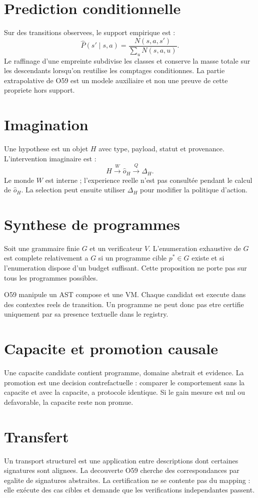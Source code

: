 \documentclass[11pt,a4paper]{article}
\begin{document}
\section{Prediction conditionnelle}
Sur des transitions observees, le support empirique est :
\[
\widehat P(s'\mid s,a)=\frac{N(s,a,s')}{\sum_u N(s,a,u)}.
\]
Le raffinage d'une empreinte subdivise les classes et conserve la masse totale sur les descendants lorsqu'on reutilise les comptages conditionnes. La partie extrapolative de O59 est un modele auxiliaire et non une preuve de cette propriete hors support.

\section{Imagination}
Une hypothese est un objet $H$ avec type, payload, statut et provenance. L'intervention imaginaire est :
\[
H\xrightarrow{W}\hat o_H\xrightarrow{Q}\Delta_H.
\]
Le monde $W$ est interne ; l'experience reelle n'est pas consultée pendant le calcul de $\hat o_H$. La selection peut ensuite utiliser $\Delta_H$ pour modifier la politique d'action.

\section{Synthese de programmes}
Soit une grammaire finie $G$ et un verificateur $V$. L'enumeration exhaustive de $G$ est complete relativement a $G$ si un programme cible $p^*\in G$ existe et si l'enumeration dispose d'un budget suffisant. Cette proposition ne porte pas sur tous les programmes possibles.

O59 manipule un AST compose et une VM. Chaque candidat est execute dans des contextes reels de transition. Un programme ne peut donc pas etre certifie uniquement par sa presence textuelle dans le registry.

\section{Capacite et promotion causale}
Une capacite candidate contient programme, domaine abstrait et evidence. La promotion est une decision contrefactuelle : comparer le comportement sans la capacite et avec la capacite, a protocole identique. Si le gain mesure est nul ou defavorable, la capacite reste non promue.

\section{Transfert}
Un transport structurel est une application entre descriptions dont certaines signatures sont alignees. La decouverte O59 cherche des correspondances par egalite de signatures abstraites. La certification ne se contente pas du mapping : elle exécute des cas cibles et demande que les verifications independantes passent.
\end{document}
